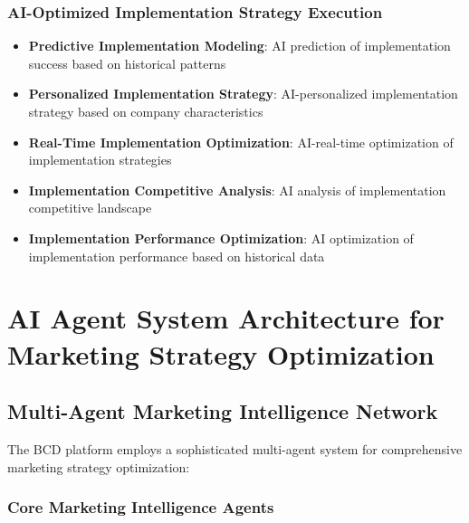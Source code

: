 \subsubsection{AI-Optimized Implementation Strategy Execution}

\begin{itemize}
    \item \textbf{Predictive Implementation Modeling}: AI prediction of implementation success based on historical patterns
    \item \textbf{Personalized Implementation Strategy}: AI-personalized implementation strategy based on company characteristics
    \item \textbf{Real-Time Implementation Optimization}: AI-real-time optimization of implementation strategies
    \item \textbf{Implementation Competitive Analysis}: AI analysis of implementation competitive landscape
    \item \textbf{Implementation Performance Optimization}: AI optimization of implementation performance based on historical data
\end{itemize}

\section{AI Agent System Architecture for Marketing Strategy Optimization}

\subsection{Multi-Agent Marketing Intelligence Network}

The BCD platform employs a sophisticated multi-agent system for comprehensive marketing strategy optimization:

\subsubsection{Core Marketing Intelligence Agents}

